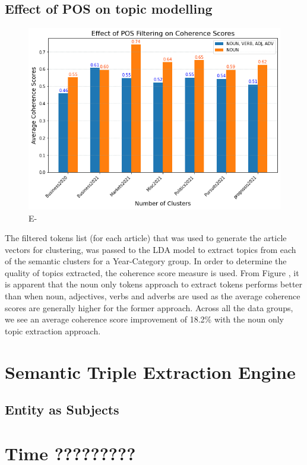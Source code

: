 \subsection{Effect of POS on topic modelling}
\begin{figure}[H]
\centering
\includegraphics[width=0.7\linewidth]{images/eval/pos_coherence.png}
\caption{E-}
\label{fig:pos_topic}
\end{figure}
\vspace{-1em}
The filtered tokens list (for each article) that was used to generate the article vectors for clustering, was passed to the LDA model to extract topics from each of the semantic clusters for a Year-Category group. In order to determine the quality of topics extracted, the coherence score measure is used. From Figure \label{fig:preprocess_topic}, it is apparent that the noun only tokens approach to extract tokens performs better than when noun, adjectives, verbs and adverbs are used as the average coherence scores are generally higher for the former approach. Across all the data groups, we see an average coherence score improvement of 18.2\% with the noun only topic extraction approach.  


\section{Semantic Triple Extraction Engine}

\subsection{Entity as Subjects}

\section{Time ?????????}

